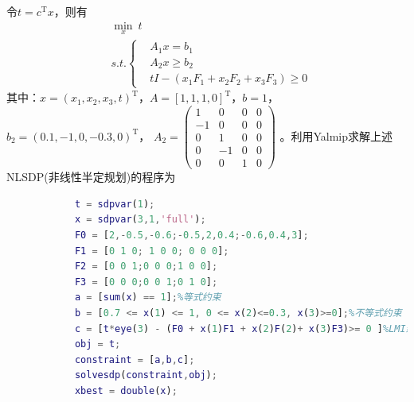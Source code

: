             \par
            令$t=c^\mathrm{T}x$，则有
            \begin{align*}
            & \min_x \ t\\
            & s.t.
            \left\{
            \begin{aligned}
            & A_1x = b_1\\
            & A_2x \geqslant b_2\\
            & tI - (x_1F_1+x_2F_2+x_3F_3) \geqslant 0
            \end{aligned}
            \right.
            \end{align*}
            其中：$x = (x_1,x_2,x_3,t)^\mathrm{T}$，$A=[1,1,1,0]^\mathrm{T}$，$b=1$，$b_2 = (0.1,-1,0,-0.3,0)^\mathrm{T}$，
            \begin{math}
            A_2=
            \left(
            \begin{smallmatrix}
            1& 0 & 0 & 0\\
            -1& 0 & 0 & 0\\
            0& 1 & 0 & 0\\
            0 &-1 & 0 & 0\\
            0& 0 & 1 &0
            \end{smallmatrix}
            \right)
            \end{math}
            。利用Yalmip求解上述NLSDP(非线性半定规划)的程序为
            \begin{lstlisting}[language = Matlab]
            %% 半定规划
            t = sdpvar(1);
            x = sdpvar(3,1,'full');
            F0 = [2,-0.5,-0.6;-0.5,2,0.4;-0.6,0.4,3];
            F1 = [0 1 0; 1 0 0; 0 0 0];
            F2 = [0 0 1;0 0 0;1 0 0];
            F3 = [0 0 0;0 0 1;0 1 0];
            a = [sum(x) == 1];%等式约束
            b = [0.7 <= x(1) <= 1, 0 <= x(2)<=0.3, x(3)>=0];%不等式约束
            c = [t*eye(3) - (F0 + x(1)F1 + x(2)F(2)+ x(3)F3)>= 0 ]%LMI约束
            obj = t;
            constraint = [a,b,c];
            solvesdp(constraint,obj);
            xbest = double(x);
            \end{lstlisting}

